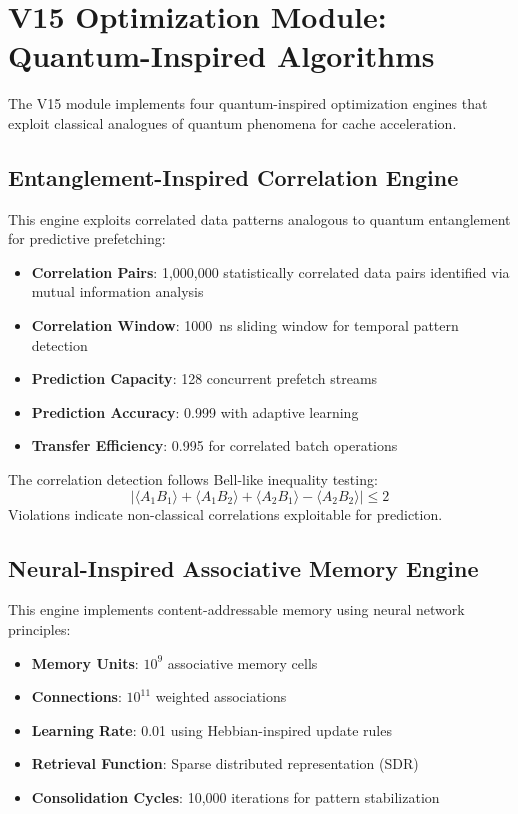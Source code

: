 \documentclass[12pt,a4paper]{article}
\theoremstyle{definition}
\begin{document}
\section{V15 Optimization Module: Quantum-Inspired Algorithms}\label{sec:v15}

The V15 module implements four quantum-inspired optimization engines that exploit classical analogues of quantum phenomena for cache acceleration.

\subsection{Entanglement-Inspired Correlation Engine}
This engine exploits correlated data patterns analogous to quantum entanglement for predictive prefetching:
\begin{itemize}
    \item \textbf{Correlation Pairs}: 1,000,000 statistically correlated data pairs identified via mutual information analysis
    \item \textbf{Correlation Window}: 1000~ns sliding window for temporal pattern detection
    \item \textbf{Prediction Capacity}: 128 concurrent prefetch streams
    \item \textbf{Prediction Accuracy}: 0.999 with adaptive learning
    \item \textbf{Transfer Efficiency}: 0.995 for correlated batch operations
\end{itemize}

The correlation detection follows Bell-like inequality testing:
\begin{equation}
|\langle A_1 B_1 \rangle + \langle A_1 B_2 \rangle + \langle A_2 B_1 \rangle - \langle A_2 B_2 \rangle| \leq 2
\end{equation}
Violations indicate non-classical correlations exploitable for prediction.

\subsection{Neural-Inspired Associative Memory Engine}
This engine implements content-addressable memory using neural network principles:
\begin{itemize}
    \item \textbf{Memory Units}: $10^9$ associative memory cells
    \item \textbf{Connections}: $10^{11}$ weighted associations
    \item \textbf{Learning Rate}: 0.01 using Hebbian-inspired update rules
    \item \textbf{Retrieval Function}: Sparse distributed representation (SDR)
    \item \textbf{Consolidation Cycles}: 10,000 iterations for pattern stabilization
\end{itemize}
\end{document}

